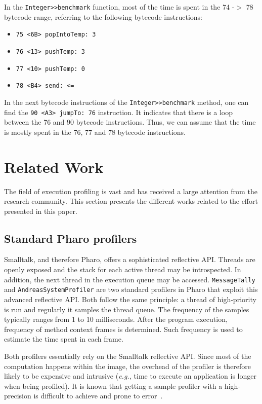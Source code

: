 \documentclass[10pt,nonatbib]{sigplanconf}
\newcommand{\ct}{\lstinline[backgroundcolor=\color{white},basicstyle=\small\ttfamily]}
\newcommand{\eg}{\emph{e.g.,}\xspace}
\newcommand{\seclabel}[1]{\label{sec:#1}}
\begin{document}
In the \ct{Integer>>benchmark} function, most of the time is spent in the 74 -$>$ 78 bytecode range, referring to the following bytecode instructions: 
\begin{itemize}
	\item \ct{75 <6B> popIntoTemp: 3}
	\item \ct{76 <13> pushTemp: 3}
	\item \ct{77 <10> pushTemp: 0}
	\item \ct{78 <B4> send: <=}
\end{itemize}
In the next bytecode instructions of the \ct{Integer>>benchmark} method, one can find the \ct{90 <A3> jumpTo: 76} instruction. It indicates that there is a loop between the 76 and 90 bytecode instructions. Thus, we can assume that the time is mostly spent in the 76, 77 and 78 bytecode instructions.

\section{Related Work}\seclabel{relatedWork}

The field of execution profiling is vast and has received a large attention from the research community. This section presents the different works related to the effort presented in this paper.

\subsection{Standard Pharo profilers}

Smalltalk, and therefore Pharo, offers a sophisticated reflective API. Threads are openly exposed and the stack for each active thread may be introspected. In addition, the next thread in the execution queue may be accessed. \ct{MessageTally} and \ct{AndreasSystemProfiler} are two standard profilers in Pharo that exploit this advanced reflective API. Both follow the same principle: a thread of high-priority is run and regularly it samples the thread queue. The frequency of the samples typically ranges from 1 to 10 milliseconds. After the program execution, frequency of method context frames is determined. Such frequency is used to estimate the time spent in each frame. 

Both profilers essentially rely on the Smalltalk reflective API. Since most of the computation happens within the image, the overhead of the profiler is therefore likely to be expensive and intrusive (\eg time to execute an application is longer when being profiled). It is known that getting a sample profiler with a high-precision is difficult to achieve and prone to error~\cite{Mytk08a,Mytk10a,Berg11d}. 
\end{document}

